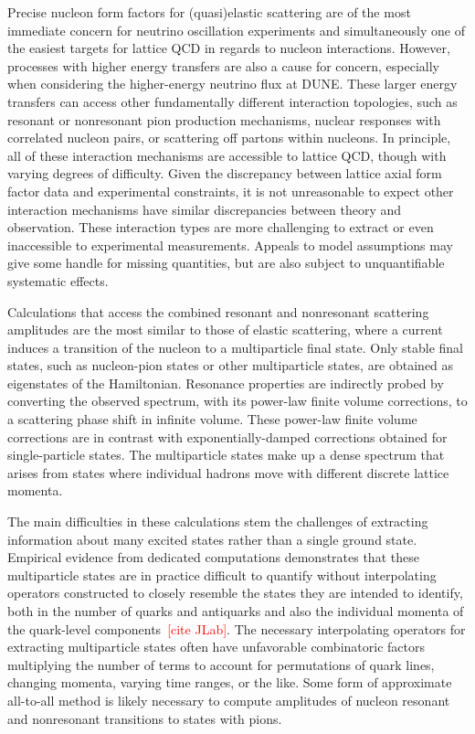 
Precise nucleon form factors for (quasi)elastic scattering are of the most immediate concern
 for neutrino oscillation experiments and simultaneously one of the easiest
 targets for lattice QCD in regards to nucleon interactions.
However, processes with higher energy transfers are also a cause for concern,
 especially when considering the higher-energy neutrino flux at DUNE.
These larger energy transfers can access other fundamentally different interaction topologies,
 such as resonant or nonresonant pion production mechanisms,
 nuclear responses with correlated nucleon pairs,
 or scattering off partons within nucleons.
In principle, all of these interaction mechanisms are accessible to lattice QCD,
 though with varying degrees of difficulty.
Given the discrepancy between lattice axial form factor data and experimental constraints,
 it is not unreasonable to expect other interaction mechanisms have similar discrepancies
 between theory and observation.
These interaction types are more challenging to extract or even inaccessible to
 experimental measurements.
Appeals to model assumptions may give some handle for missing quantities,
 but are also subject to unquantifiable systematic effects.

Calculations that access the combined resonant and nonresonant scattering amplitudes
 are the most similar to those of elastic scattering,
 where a current induces a transition of the nucleon to a multiparticle final state.
Only stable final states, such as nucleon-pion states or other multiparticle states,
 are obtained as eigenstates of the Hamiltonian.
Resonance properties are indirectly probed by converting the observed spectrum,
 with its power-law finite volume corrections, to a scattering phase shift in infinite volume.
These power-law finite volume corrections are in contrast with exponentially-damped
 corrections obtained for single-particle states.
The multiparticle states make up a dense spectrum that arises from
 states where individual hadrons move with different discrete lattice momenta.

The main difficulties in these calculations stem the challenges of extracting
 information about many excited states rather than a single ground state.
Empirical evidence from dedicated computations demonstrates that these multiparticle states
 are in practice difficult to quantify without interpolating operators constructed to
 closely resemble the states they are intended to identify,
 both in the number of quarks and antiquarks and also the individual
 momenta of the quark-level components~\textcolor{red}{[cite JLab]}.
The necessary interpolating operators for extracting multiparticle states often have
 unfavorable combinatoric factors multiplying the number of terms to account for
 permutations of quark lines, changing momenta, varying time ranges, or the like.
Some form of approximate all-to-all method is likely necessary
 to compute amplitudes of nucleon resonant and nonresonant transitions
 to states with pions.


